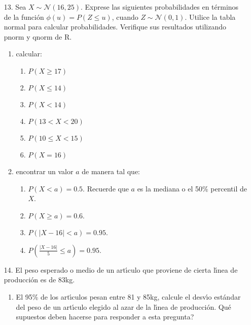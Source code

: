 \documentclass[11pt,a4paper,twoside]{article}%
\begin{document}
\begin{enumerate}

\item[13.] Sea $X\sim\mathcal{N}(16,25)$.  Exprese las siguientes probabilidades en t\'erminos de la funci\'on $\phi(u)=P(Z\leq u)$, cuando $Z\sim \mathcal N(0,1)$. Utilice la tabla normal para calcular probabilidades. Verifique sus resultados utilizando  pnorm y qnorm de R. 
\begin{enumerate}
\item calcular:

\begin{enumerate}
\item $P(X\geq17)$

\item $P(X\leq14)$

\item $P(X<14)$

\item $P(13<X<20)$

\item $P(10\leq X<15)$

\item $P(X=16)$
\end{enumerate}

\item encontrar un valor $a$ de manera tal que:

\begin{enumerate}
\item $P(X<a)=0.5$. Recuerde que $a$ es la mediana o el 50\% percentil de $X$.

\item $P(X\geq a)=0.6.$

\item $P(\left\vert X-16\right\vert <a)=0.95.$

\item $P\left(\frac{\left\vert X-16\right\vert }{5}\leq a\right)=0.95.$
\end{enumerate}
\end{enumerate}

\item[14.] El peso esperado o medio de un art\'{\i}culo que proviene de cierta
l\'{\i}nea de producci\'{o}n es de 83kg.

\begin{enumerate}
\item El 95\% de los art\'{\i}culos pesan entre 81 y 85kg, calcule el
desv\'{\i}o est\'{a}ndar del peso de un art\'{\i}culo elegido al azar de la
l\'{\i}nea de producci\'{o}n. \textquestiondown Qu\'{e} supuestos deben
hacerse para responder a esta pregunta?


\end{enumerate}
\end{enumerate}
\end{document}
